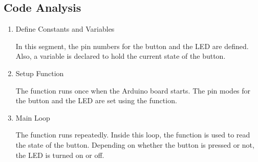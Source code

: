 \documentclass[a4paper,11pt,english]{sphinxmanual}
\begin{document}
\subsection{Code Analysis}
\label{\detokenize{Basic_Project/Button_LED:code-analysis}}\begin{enumerate}
%
\item {} 
\sphinxAtStartPar
Define Constants and Variables

\sphinxAtStartPar
In this segment, the pin numbers for the button and the LED are defined. Also, a variable  is declared to hold the current state of the button.

\begin{sphinxVerbatim}[commandchars=\\\{\}]
\end{sphinxVerbatim}

\item {} 
\sphinxAtStartPar
Setup Function

\sphinxAtStartPar
The  function runs once when the Arduino board starts. The pin modes for the button and the LED are set using the  function.

\begin{sphinxVerbatim}[commandchars=\\\{\}]
\end{sphinxVerbatim}

\item {} 
\sphinxAtStartPar
Main Loop

\sphinxAtStartPar
The  function runs repeatedly. Inside this loop, the  function is used to read the state of the button. Depending on whether the button is pressed or not, the LED is turned on or off.


\end{enumerate}
\end{document}
